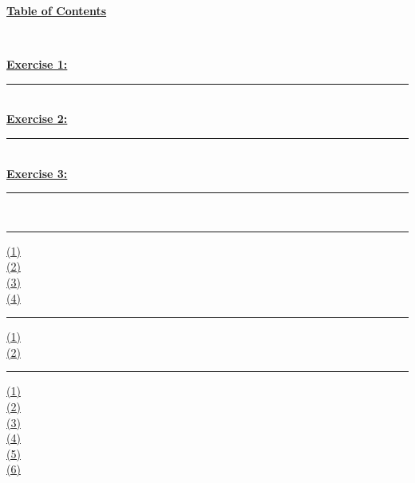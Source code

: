 \documentclass[12pt]{article}
\begin{document}
\begin{center}
    \hypertarget{toc}{\LARGE \noindent \underline{\textbf{Table of Contents}}}\\
\end{center}

\noindent \hyperlink{1}{\textbf{Exercise 1:}}
\vspace{1mm}
\hrule
\vspace{1mm} \leavevmode \\

\noindent \hyperlink{2}{\textbf{Exercise 2:}}
\vspace{1mm}
\hrule
\vspace{1mm} \leavevmode \\

\noindent \hyperlink{3}{\textbf{Exercise 3:}}
\vspace{1mm}
\hrule
\vspace{1mm} \leavevmode \\

\vspace{1mm}
\hrule
\vspace{1mm}
\noindent\hyperlink{4.1}{(1)}\\
\hyperlink         {4.2}{(2)}\\
\hyperlink         {4.3}{(3)}\\
\hyperlink         {4.4}{(4)}\\

\vspace{1mm}
\hrule
\vspace{1mm}
\noindent\hyperlink{5.1}{(1)}\\
\hyperlink         {5.2}{(2)}\\

\vspace{1mm}
\hrule
\vspace{1mm}
\noindent\hyperlink{6.1}{(1)}\\
\hyperlink         {6.2}{(2)}\\
\hyperlink         {6.3}{(3)}\\
\hyperlink         {6.4}{(4)}\\
\hyperlink         {6.5}{(5)}\\
\hyperlink         {6.6}{(6)}\\
\end{document}
